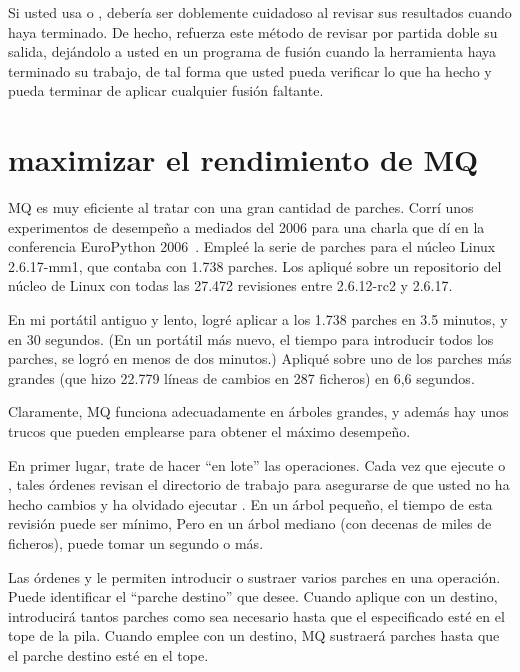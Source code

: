 Si usted usa  o , debería ser
doblemente cuidadoso al revisar sus resultados cuando haya terminado.
De hecho,  refuerza este método de revisar por partida
doble su salida, dejándolo a usted en un programa de fusión cuando la
herramienta haya terminado su trabajo, de tal forma que usted pueda
verificar lo que ha hecho y pueda terminar de aplicar cualquier fusión
faltante.

\section{maximizar el rendimiento de MQ}
\label{sec:mq:perf}

MQ es muy eficiente al tratar con una gran cantidad de parches.  Corrí
unos experimentos de desempeño a mediados del 2006 para una charla que
dí en la conferencia EuroPython 2006~\cite{web:europython}.  Empleé la
serie de parches para el núcleo Linux 2.6.17-mm1, que contaba con 1.738
parches.  Los apliqué sobre un repositorio del núcleo de Linux con
todas las 27.472 revisiones entre 2.6.12-rc2 y 2.6.17.

En mi portátil antiguo y lento, logré aplicar 
 a los 1.738 parches en 3.5
minutos, y  en 30 segundos.
(En un portátil más nuevo, el tiempo para introducir todos los
parches, se logró en menos de dos minutos.)  Apliqué
 sobre uno de los parches más grandes (que hizo
22.779 líneas de cambios en 287 ficheros) en 6,6 segundos.

Claramente, MQ funciona adecuadamente en árboles grandes, y además hay
unos trucos que pueden emplearse para obtener el máximo desempeño.

En primer lugar, trate de hacer ``en lote'' las operaciones.  Cada vez
que ejecute  o , tales órdenes
revisan el directorio de trabajo para asegurarse de que usted no ha
hecho cambios y ha olvidado ejecutar .  En un
árbol pequeño, el tiempo de esta revisión puede ser mínimo,  Pero en
un árbol mediano (con decenas de miles de ficheros), puede tomar un
segundo o más.

Las órdenes  y  le permiten
introducir o sustraer varios parches en una operación.  Puede
identificar el ``parche destino'' que desee.  Cuando aplique
 con un destino, introducirá tantos parches como sea
necesario hasta que el especificado esté en el tope de la pila.
Cuando emplee  con un destino, MQ sustraerá parches
hasta que el parche destino esté en el tope.

